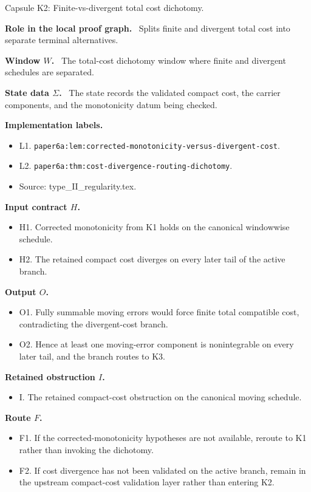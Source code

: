 \documentclass[11pt]{amsart}
\newcommand{\capsulefield}[1]{\par\smallskip\noindent\textbf{#1.}\ }
\begin{document}
\begin{proofcapsule}{Capsule K2: Finite-vs-divergent total cost dichotomy.}
  \capsulefield{Role in the local proof graph}
  Splits finite and divergent total cost into separate terminal alternatives.

  \capsulefield{Window \(W\)}
The total-cost dichotomy window where finite and divergent schedules are separated.

  \capsulefield{State data \(\Sigma\)}
The state records the validated compact cost, the carrier components, and the monotonicity datum being checked.

  \capsulefield{Implementation labels}
  \begin{itemize}[leftmargin=1.8em]
  \item L1. \texttt{paper6a:lem:corrected-monotonicity-versus-divergent-cost}.
  \item L2. \texttt{paper6a:thm:cost-divergence-routing-dichotomy}.
  \item Source: type\_II\_regularity.tex.
  \end{itemize}

  \capsulefield{Input contract \(H\)}
  \begin{itemize}[leftmargin=1.8em]
  \item H1. Corrected monotonicity from K1 holds on the canonical windowwise schedule.
  \item H2. The retained compact cost diverges on every later tail of the active branch.
  \end{itemize}

  \capsulefield{Output \(O\)}
  \begin{itemize}[leftmargin=1.8em]
  \item O1. Fully summable moving errors would force finite total compatible cost, contradicting the divergent-cost branch.
  \item O2. Hence at least one moving-error component is nonintegrable on every later tail, and the branch routes to K3.
  \end{itemize}

  \capsulefield{Retained obstruction \(I\)}
  \begin{itemize}[leftmargin=1.8em]
  \item I. The retained compact-cost obstruction on the canonical moving schedule.
  \end{itemize}

  \capsulefield{Route \(F\)}
  \begin{itemize}[leftmargin=1.8em]
  \item F1. If the corrected-monotonicity hypotheses are not available, reroute to K1 rather than invoking the dichotomy.
  \item F2. If cost divergence has not been validated on the active branch, remain in the upstream compact-cost validation layer rather than entering K2.
  \end{itemize}


\end{proofcapsule}
\end{document}
